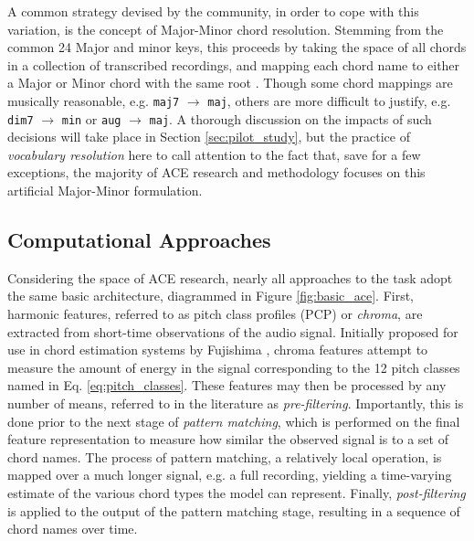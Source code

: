 A common strategy devised by the community, in order to cope with this variation, is the concept of Major-Minor chord resolution.
Stemming from the common 24 Major and minor keys, this proceeds by taking the space of all chords in a collection of transcribed recordings, and mapping each chord name to either a Major or Minor chord with the same root \cite{McVicar2013}.
Though some chord mappings are musically reasonable, e.g. \texttt{maj7} $\to$ \texttt{maj}, others are more difficult to justify, e.g. \texttt{dim7} $\to$ \texttt{min} or \texttt{aug} $\to$ \texttt{maj}.
A thorough discussion on the impacts of such decisions will take place in Section \ref{sec:pilot_study}, but the practice of \emph{vocabulary resolution} here to call attention to the fact that, save for a few exceptions, the majority of ACE research and methodology focuses on this artificial Major-Minor formulation.


\subsection{Computational Approaches}
\label{subsec:computational_approaches}
Considering the space of ACE research, nearly all approaches to the task adopt the same basic architecture, diagrammed in Figure \ref{fig:basic_ace}.
First, harmonic features, referred to as pitch class profiles (PCP) or \emph{chroma}, are extracted from short-time observations of the audio signal.
Initially proposed for use in chord estimation systems by Fujishima \cite{fujishima1999}, chroma features attempt to measure the amount of energy in the signal corresponding to the 12 pitch classes named in Eq. \ref{eq:pitch_classes}.
These features may then be processed by any number of means, referred to in the literature as \emph{pre-filtering}.
Importantly, this is done prior to the next stage of \emph{pattern matching}, which is performed on the final feature representation to measure how similar the observed signal is to a set of chord names.
The process of pattern matching, a relatively local operation, is mapped over a much longer signal, e.g. a full recording, yielding a time-varying estimate of the various chord types the model can represent.
Finally, \emph{post-filtering} is applied to the output of the pattern matching stage, resulting in a sequence of chord names over time.


